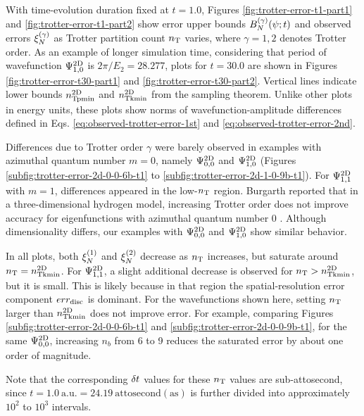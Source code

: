 \documentclass[a4paper,11pt]{article}
\begin{document}
With time-evolution duration fixed at $t=1.0$, Figures
\ref{fig:trotter-error-t1-part1} and
\ref{fig:trotter-error-t1-part2} show error upper bounds
$B_{N}^{(\gamma)}(\psi;t)$ and observed errors $\xi_{N}^{(\gamma)}$ as Trotter partition
count $n_{\mathrm{T}}$ varies, where $\gamma=1,2$ denotes Trotter order. As an example of
longer simulation time, considering that period of wavefunction
$\Psi^{\mathrm{2D}}_{1,0}$ is $2\pi/E_2=28.277$, plots for $t=30.0$ are shown in
Figures \ref{fig:trotter-error-t30-part1} and
\ref{fig:trotter-error-t30-part2}. Vertical lines indicate lower bounds
$n_{\mathrm{Tpmin}}^{\mathrm{2D}}$ and $n_{\mathrm{Tkmin}}^{\mathrm{2D}}$ from the sampling theorem. Unlike other plots in
energy units, these plots show norms of wavefunction-amplitude differences
defined in Eqs. \eqref{eq:observed-trotter-error-1st} and
\eqref{eq:observed-trotter-error-2nd}.

Differences due to Trotter order $\gamma$ were barely observed in examples with
azimuthal quantum number $m=0$, namely $\Psi^{\mathrm{2D}}_{0,0}$ and $\Psi^{\mathrm{2D}}_{1,0}$
(Figures \ref{subfig:trotter-error-2d-0-0-6b-t1} to
\ref{subfig:trotter-error-2d-1-0-9b-t1}). For $\Psi^{\mathrm{2D}}_{1,1}$ with $m=1$,
differences appeared in the low-$n_{\mathrm{T}}$ region. Burgarth reported that in a
three-dimensional hydrogen model, increasing Trotter order does not improve
accuracy for eigenfunctions with azimuthal quantum number 0
\cite{Burgarth2024.PhysRevResearch.6.043155}. Although dimensionality differs,
our examples with $\Psi^{\mathrm{2D}}_{0,0}$ and $\Psi^{\mathrm{2D}}_{1,0}$ show similar behavior.

In all plots, both $\xi_{N}^{(1)}$ and $\xi_{N}^{(2)}$ decrease as $n_{\mathrm{T}}$ increases, but
saturate around $n_{\mathrm{T}}=n_{\mathrm{Tkmin}}^{\mathrm{2D}}$. For $\Psi^{\mathrm{2D}}_{1,1}$, a slight additional
decrease is observed for $n_{\mathrm{T}}>n_{\mathrm{Tkmin}}^{\mathrm{2D}}$, but it is small. This is likely
because in that region the spatial-resolution error component $err_{\mathrm{disc}}$ is
dominant. For the wavefunctions shown here, setting $n_{\mathrm{T}}$ larger than
$n_{\mathrm{Tkmin}}^{\mathrm{2D}}$ does not improve error. For example, comparing
Figures \ref{subfig:trotter-error-2d-0-0-6b-t1} and
\ref{subfig:trotter-error-2d-0-0-9b-t1}, for the same $\Psi^{\mathrm{2D}}_{0,0}$,
increasing $n_b$ from 6 to 9 reduces the saturated error by about one order of
magnitude.

Note that the corresponding $\delta t$ values for these $n_{\mathrm{T}}$ values are
sub-attosecond, since $t=1.0\ \mathrm{a.u.}=24.19\ \mathrm{attosecond}
(\mathrm{as})$ is further divided into approximately $10^2$ to $10^3$ intervals.
\end{document}
